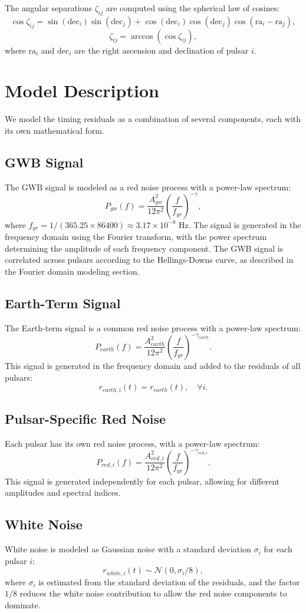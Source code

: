 \documentclass[11pt]{article}
\begin{document}
The angular separations $\zeta_{ij}$ are computed using the spherical law of cosines:
\[
\cos \zeta_{ij} = \sin(\text{dec}_i) \sin(\text{dec}_j) + \cos(\text{dec}_i) \cos(\text{dec}_j) \cos(\text{ra}_i - \text{ra}_j),
\]
\[
\zeta_{ij} = \arccos(\cos \zeta_{ij}),
\]
where $\text{ra}_i$ and $\text{dec}_i$ are the right ascension and declination of pulsar $i$.

\section{Model Description}
We model the timing residuals as a combination of several components, each with its own mathematical form.

\subsection{GWB Signal}
The GWB signal is modeled as a red noise process with a power-law spectrum:
\[
P_{gw}(f) = \frac{A_{gw}^2}{12 \pi^2} \left( \frac{f}{f_{yr}} \right)^{-\gamma},
\]
where $f_{yr} = 1/(365.25 \times 86400) \approx 3.17 \times 10^{-8}$ Hz. The signal is generated in the frequency domain using the Fourier transform, with the power spectrum determining the amplitude of each frequency component. The GWB signal is correlated across pulsars according to the Hellings-Downs curve, as described in the Fourier domain modeling section.

\subsection{Earth-Term Signal}
The Earth-term signal is a common red noise process with a power-law spectrum:
\[
P_{earth}(f) = \frac{A_{earth}^2}{12 \pi^2} \left( \frac{f}{f_{yr}} \right)^{-\gamma_{earth}}.
\]
This signal is generated in the frequency domain and added to the residuals of all pulsars:
\[
r_{earth,i}(t) = r_{earth}(t), \quad \forall i.
\]

\subsection{Pulsar-Specific Red Noise}
Each pulsar has its own red noise process, with a power-law spectrum:
\[
P_{red,i}(f) = \frac{A_{red,i}^2}{12 \pi^2} \left( \frac{f}{f_{yr}} \right)^{-\gamma_{red,i}}.
\]
This signal is generated independently for each pulsar, allowing for different amplitudes and spectral indices.

\subsection{White Noise}
White noise is modeled as Gaussian noise with a standard deviation $\sigma_i$ for each pulsar $i$:
\[
r_{white,i}(t) \sim \mathcal{N}(0, \sigma_i / 8),
\]
where $\sigma_i$ is estimated from the standard deviation of the residuals, and the factor $1/8$ reduces the white noise contribution to allow the red noise components to dominate.
\end{document}
